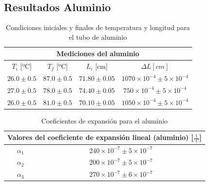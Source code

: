 \documentclass[a4paper]{article}
\begin{document}
\subsection*{Resultados Aluminio}
\begin{table}[H]
    \centering
    \begin{tabular}{|c|c|c|c|}\hline
    \multicolumn{4}{|c|}{\textbf{Mediciones del aluminio}} \\ \hline
     $T_{i}$ [ºC] & $T_{f}$ [ºC] & $L_{i}$ [cm] & $\Delta L [cm]$\\ \hline
     $26.0\pm0.5$ & $87.0\pm0.5$ & $71.80\pm0.05$ & $1070\times10^{-4}\pm5\times10^{-4}$ \\ \hline
     $27.0\pm0.5$ & $78.0\pm0.5$ & $74.40\pm0.05$ & $750\times10^{-4}\pm5\times10^{-4}$ \\ \hline
     $26.0\pm0.5$ & $81.0\pm0.5$ & $70.10\pm0.05$ & $1050\times10^{-4}\pm5\times10^{-4}$ \\ \hline
    \end{tabular}
    \caption{Condiciones iniciales y finales de temperatura y longitud para el tubo de aluminio}
    \label{Tabla 2}
\end{table}

\begin{table}[H]
    \centering
    \begin{tabular}{|c|c|} \hline
    \multicolumn{2}{|c|}{Valores del coeficiente de expansión lineal (aluminio) [$\frac{1}{^{\circ}C}$]} \\ \hline
    
         $\alpha_{1}$ & $240\times 10^{-7}\pm 5\times10^{-7}$ \\ \hline
         $\alpha_{2}$ & $200 \times 10^{-7}\pm 5\times10^{-7}$ \\ \hline
         $\alpha_{3}$ &  $270\times 10^{-7}\pm 6\times10^{-7}$ \\ \hline
         
    \end{tabular}
    \caption{Coeficientes de expansión para el aluminio}
    \label{Tabla 2.2}
\end{table}
\end{document}
